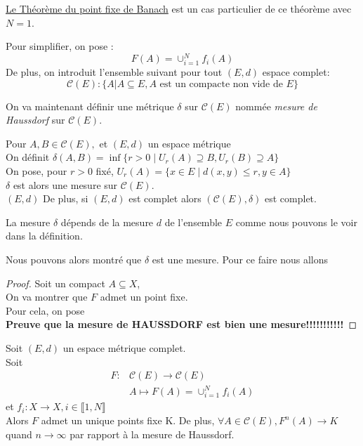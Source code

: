 \documentclass[a4paper, 12pt]{report}
\begin{document}
		\begin{remark*}
		\hyperref[ThmPtFixe]{Le Théorème du point fixe de Banach} est un cas particulier de ce théorème avec $N=1$.
		\end{remark*}
		
		Pour simplifier, on pose :
		\begin{equation*}
			F(A)=\cup^N_{i=1}f_i(A)
		\end{equation*}
		De plus, on introduit l'ensemble suivant pour tout $(E,d)$ espace complet:
		\begin{equation*}
			\mathcal{C}(E) : \{A|A\subseteq E, A\textrm{ est un compacte non vide de }E\}
		\end{equation*}
		
		On va maintenant définir une métrique $\delta$ sur $\mathcal{C}(E)$ nommée \textit{mesure de Haussdorf} sur $\mathcal{C}(E)$.
		\begin{prop}
			\label{mesHauss}
			Pour $A,B\in\mathcal{C}(E),$ et $(E,d)$ un espace métrique\\
			On définit $\delta(A,B)=\inf\{r>0\mid U_r(A)\supseteq B, U_r(B)\supseteq A\}$\\
			On pose, pour $r>0$ fixé, $U_r(A)=\{x\in E\mid d(x,y)\leq r,y\in A\}$\\
			$\delta$ est alors une mesure sur $\mathcal{C}(E)$.\\$(E,d)$
			De plus, si $(E,d)$ est complet alors $(\mathcal{C}(E),\delta)$ est complet.
		\end{prop}
		\begin{remark*}
			La mesure $\delta$ dépends de la mesure $d$ de l'ensemble $E$ comme nous pouvons le voir dans la définition. 
		\end{remark*}

		
		Nous pouvons alors montré que $\delta$ est une mesure. Pour ce faire nous allons 
		\begin{proof}
			Soit un compact $A\subseteq X$,\\
			On va montrer que $F$ admet un point fixe.\\
			Pour cela, on pose \\
			\textbf{Preuve que la mesure de HAUSSDORF est bien une mesure!!!!!!!!!!!}
		\end{proof}
		
		\begin{theorem}
			Soit $(E,d)$ un espace métrique complet.\\
			Soit 
			\begin{align*}
				F:&\mathcal{C}(E)\longrightarrow \mathcal{C}(E)\\
				  &A\longmapsto F(A)=\cup^N_{i=1}f_i(A)
			\end{align*}
			et $f_i:X \longrightarrow X, i\in\llbracket 1,N\rrbracket$\\
			Alors $F$ admet un unique points fixe K. De plus, $\forall A\in\mathcal{C}(E), F^n(A)\longrightarrow K$ quand ${n\to\infty}$ par rapport à la mesure de Haussdorf.
		\end{theorem}
\end{document}
